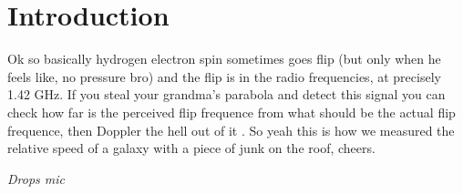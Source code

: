 \section{Introduction}
Ok so basically hydrogen electron spin sometimes goes flip (but only when he feels like, no pressure bro) and the flip is in the radio frequencies, at precisely 1.42 GHz.
If you steal your grandma's parabola and detect this signal you can check how far is the perceived flip frequence from what should be the actual flip frequence, then Doppler the hell out of it \cite{burke_introduction_2013}.
So yeah this is how we measured the relative speed of a galaxy with a piece of junk on the roof, cheers. 

\emph{Drops mic}